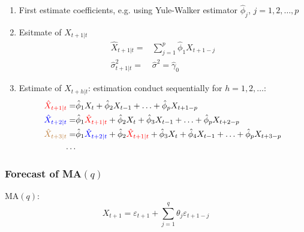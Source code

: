     \begin{enumerate}[topsep=2pt,itemsep=2pt]
        \item First estimate coefficients, e.g. using Yule-Walker estimator $ \hat{\phi }_j $, $ j=1,2,\ldots,p $
        \item Esitmate of $ X_{t+1|t} $
        \begin{align}
            \hat{X}_{t+1|t}= &\sum_{j=1}^p\hat{\phi} _1X_{t+1-j}\\
            \hat{\sigma }_{t+1|t}^2=&\hat{\sigma }^2=\hat{\gamma }_0
        \end{align}
        \item Estimate of $ X_{t+h|t} $: estimation conduct sequentially for $ h=1,2,\ldots $:
        \begin{align}
            {\color{red}\hat{X}_{t+1|t}}= &\hat{\phi} _1X_{t} +\hat{\phi} _2 X_{t-1}+\ldots+\hat{\phi} _pX_{t+1-p} \\
            {\color{blue}\hat{X}_{t+2|t}}= &\hat{\phi} _1{\color{red}\hat{X}_{t+1|t}}+\hat{\phi }_2X_{t}+ \hat{\phi }_3X_{t-1}+ \ldots+ \hat{\phi }_pX_{t+2-p}\\
            {\color{brown}\hat{X}_{t+3|t}}= &\hat{\phi} _1{\color{blue}\hat{X}_{t+2|t}}+\hat{\phi }_2{\color{red}\hat{X}_{t+1|t}}+ \hat{\phi }_3X_{t}+ \hat{\phi }_4X_{t-1} + \ldots+ \hat{\phi }_pX_{t+3-p}\\
            \ldots&
        \end{align}
            
        
        
        
    \end{enumerate}
    
        
\subsubsection{Forecast of MA$ (q) $}
    MA$ (q) $:
    \begin{equation}
        X_{t+1}=\varepsilon _{t+1}+\sum_{j=1}^q\theta _j\varepsilon _{t+1-j}
    \end{equation}

